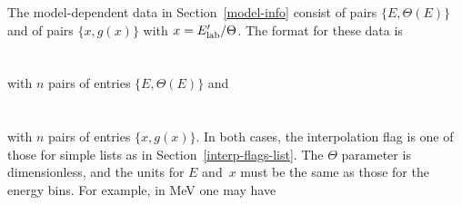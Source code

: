 The model-dependent data in Section~\ref{model-info}
consist of pairs $\{E, \Theta(E)\}$ and of pairs
$\{x, g(x)\}$ with $x = E_{\text{lab}}'/\Theta$.  The format for these data is\\
  \\
  \\
with $n$ pairs of entries $\{E, \Theta(E)\}$ and\\
  \\
  \\
with $n$ pairs of entries $\{x, g(x)\}$.
In both cases, the interpolation flag is one of those for simple lists as in 
Section~\ref{interp-flags-list}.
The $\Theta$ parameter is dimensionless, and the units for $E$ and~$x$
must be the same as those for the energy bins.
For example, in MeV one may have\\
  \\
  \\
  \\
  \\
  \\
  \\
  \\
  \\
  \\
  \Input{ }{ $\cdots$}\\
  \
